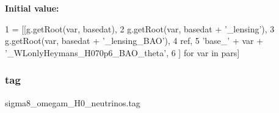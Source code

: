 {\bfseries Initial value\+:}
\begin{DoxyCode}
1 =  [[g.getRoot(var, basedat),
2               g.getRoot(var, basedat + \textcolor{stringliteral}{'\_lensing'}),
3               g.getRoot(var, basedat + \textcolor{stringliteral}{'\_lensing\_BAO'}),
4               ref,
5               \textcolor{stringliteral}{'base\_'} + var + \textcolor{stringliteral}{'\_WLonlyHeymans\_H070p6\_BAO\_theta'},
6               ] \textcolor{keywordflow}{for} var \textcolor{keywordflow}{in} pars]
\end{DoxyCode}
\mbox{\label{namespacesigma8__omegam__H0__neutrinos_a050c3cd647e607a234ee3875aa9e36e1}} 
\subsubsection{\texorpdfstring{tag}{tag}}
{\footnotesize\ttfamily sigma8\+\_\+omegam\+\_\+\+H0\+\_\+neutrinos.\+tag}

